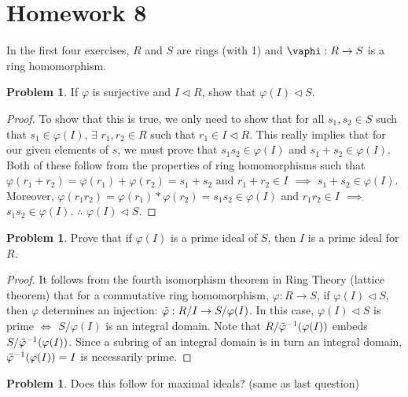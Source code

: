 \documentclass[11pt]{article}
\theoremstyle{definition}
\newtheorem{prob}[thm]{Problem}
\numberwithin{equation}{section}
\begin{document}
\section{Homework 8}
In the first four exercises, $R$ and $S$ are rings (with 1) and $\vaphi: R \rightarrow S$ is a ring homomorphism.

\begin{prob}
If $\varphi$ is surjective and $I \vartriangleleft R$, show that $\varphi(I) \vartriangleleft S$.
\end{prob}

\begin{proof}
To show that this is true, we only need to show that for all $s_{1}, s_{2} \in S$ such that $s_{1} \in \varphi(I)$, $\exists$ $r_{1}, r_{2} \in R$ such that $r_{1} \in I \vartriangleleft R$. This really implies that for our given elements of $s$, we must prove that $s_{1}s_{2} \in \varphi(I)$ and $s_{1} + s_{2} \in \varphi(I)$. Both of these follow from the properties of ring homomorphisms such that $\varphi(r_{1} + r_{2}) = \varphi(r_{1}) + \varphi(r_{2}) = s_{1} + s_{2}$ and $r_{1}+r_{2} \in I$ $\implies$ $s_{1} + s_{2} \in \varphi(I)$. Moreover, $\varphi(r_{1}r_{2}) = \varphi(r_{1}) *\varphi(r_{2}) = s_{1}s_{2} \in \varphi(I)$ and $r_{1}r_{2} \in I$ $\implies$ $s_{1}s_{2} \in \varphi(I)$. $\therefore$ $\varphi(I) \vartriangleleft S$.
\end{proof}

\begin{prob}
Prove that if $\varphi(I)$ is a prime ideal of $S$, then $I$ is a prime ideal for $R$.
\end{prob}

\begin{proof}
It follows from the fourth isomorphism theorem in Ring Theory (lattice theorem) that for a commutative ring homomorphism, $\varphi: R \rightarrow S$, if $\varphi(I) \vartriangleleft S$, then $\varphi$ determines an injection: $\Tilde{\varphi}: R/I \rightarrow S/\varphi(I)$. In this case, $\varphi(I) \vartriangleleft S$ is prime $\Longleftrightarrow$ $S/\varphi(I)$ is an integral domain. Note that $R/\Tilde{\varphi}^{-1}(\varphi(I))$ embeds $S/\Tilde{\varphi}^{-1}(\varphi(I))$. Since a subring of an integral domain is in turn an integral domain, $\Tilde{\varphi}^{-1}(\varphi(I)) = I$ is necessarily prime.
\end{proof}

\begin{prob}
Does this follow for maximal ideals? (same as last question)
\end{prob}
\end{document}
